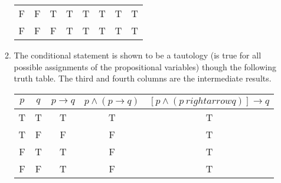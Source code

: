 \documentclass[11pt]{article}
\begin{document}
\begin{enumerate}
\begin{enumerate}[label=(\alph*)]
\begin{center}
\begin{tabular}{|c|c|c|c|c|c|c|c|}
F & F & T & T & T & T & T & T \\
F & F & F & T & T & T & T & T \\
\hline
\end{tabular}
\end{center}
\item
The conditional statement is shown to be a tautology (is true for all possible
assignments of the propositional variables) though the following truth table. The
third and fourth columns are the intermediate results.
\begin{center}
\begin{tabular}{|c|c|c|c|c|}
\hline
$p$ & $q$ & $p \rightarrow q$ & $p \land (p \rightarrow q)$ & $[p \land (p \
rightarrow q)] \rightarrow q$\\
\hline
T & T & T & T & T\\
T & F & F & F & T\\
F & T & T & F & T\\
F & F & T & F & T\\
\hline
\end{tabular}
\end{center}
\end{enumerate}
\end{enumerate}
\end{document}
